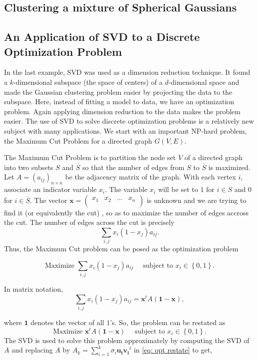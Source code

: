 \subsection{Clustering a mixture of Spherical Gaussians}
\subsection{An Application of SVD to a Discrete Optimization Problem}
In the last example, SVD was used as a dimension reduction technique. It found a \(k\)-dimensional subspace (the space of centers) of a \(d\)-dimensional space and made the Gaussian clustering problem easier by projecting the data to the subspace. Here, instead of fitting a model to data, we have an optimization problem. Again applying dimension reduction to the data makes the problem easier. The use of SVD to solve discrete optimization problems is a relatively new subject with many applications. We start with an important NP-hard problem, the Maximum Cut Problem for a directed graph \(G(V,E)\).  

The Maximum Cut Problem is to partition the node set \(V\) of a directed graph into two subsets \(S\) and \(\overline{S} \) so that the number of edges from \(S\) to \(\overline{S} \) is maximized. Let \(A=(a_{ij})_{n \times n}\) be the adjacency matrix of the graph. With each vertex \(i\), associate an indicator variable \(x_i\).  The variable \(x_i\) will be set to \(1\) for \(i \in S\) and \(0\) for \(i \in \overline{S} \). The vector \(\mathbf{x} = \begin{pmatrix}
  x_1 & x_2 & \dots  & x_n  \\
\end{pmatrix}\) is unknown and we are trying to find it (or equivalently the cut) , so as to maximize the number of edges accross the cut. The number of edges across the cut is precisely 
\[
  \sum_{i, j} x_i (1-x_j)a_{ij} .
\] 
Thus, the Maximum Cut problem can be posed as the optimization problem 

\[
  \text{Maximize } \sum_{i, j} x_i (1-x_j) a_{ij} \quad \text{ subject to } x_i \in \left\{ 0, 1 \right\}.   
\]

In matrix notation, 
\begin{equation}\label{eq: opt restate}
    \sum_{i,j} x_i (1-x_j) a_{ij} = \mathbf{x} ^t A (\mathbf{1} - \mathbf{x} ),  
\end{equation}

where \(\mathbf{1} \) denotes the vector of all \(1\)'s. So, the problem can be restated as 
\[
  \text{Maximize } \mathbf{x} ^t A (\mathbf{1} - \mathbf{x}  ) \quad \text{ subject to } x_i \in \left\{ 0,1 \right\} .
\]  
The SVD is used to solve this problem approximately by computing the SVD of \(A\) and replacing \(A\) by \(A_k=\sum_{i=1}^k \sigma _i \mathbf{u_i} \mathbf{v_i}^t   \) in \autoref{eq: opt restate} to get,

